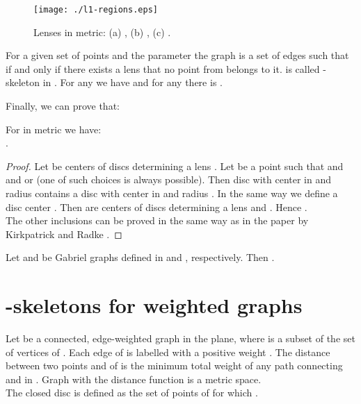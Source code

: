 \documentclass[11pt]{llncs}
\begin{document}
\begin{figure}[htbp]
\centering
\texttt{[image: ./l1-regions.eps]}
\caption{Lenses in  metric: (a) , (b) ,
(c) .}
\label{fig:l_1}
\end{figure}


\begin{corollary}
\label{equality}
For a given set of points  and the parameter  the graph 
 is a set of edges such that  if and only if 
there exists a lens  that no point from  belongs 
to it.  is called -skeleton in .
For any  we have  and for any  there is 
.
\end{corollary}

Finally, we can prove that:

\begin{lemma}
\label{finalequalityl1}
For  in  metric we have:\\
.
\end{lemma}
\begin{proof}  
Let  be centers of discs determining a lens .
Let  be a point such that 
and 
and  or  (one of such choices is always possible).
Then disc with center in  and radius  contains a disc with center
in  and radius . 
In the same way we define a disc center .  
Then  are centers of discs determining a lens 
and . 
Hence . \\
The other inclusions can be proved in the same way as in the paper by Kirkpatrick and Radke 
\cite{kr85}.    
\end{proof} 

\begin{corollary}
Let  and  be Gabriel graphs defined in \cite{w06} and \cite{mg11}, respectively.
Then .
\end{corollary}



\section{-skeletons for weighted graphs}

Let  be a connected, edge-weighted graph in the plane, where  
is a subset of the set of vertices of . Each edge of  is labelled with 
a positive weight . 
The distance  between two points  and  of  is the minimum total weight 
of any path connecting  and  in .
Graph  with the distance function  is a metric space.\\
The closed disc  is defined as the set of points  of  for which .\\
\end{document}
